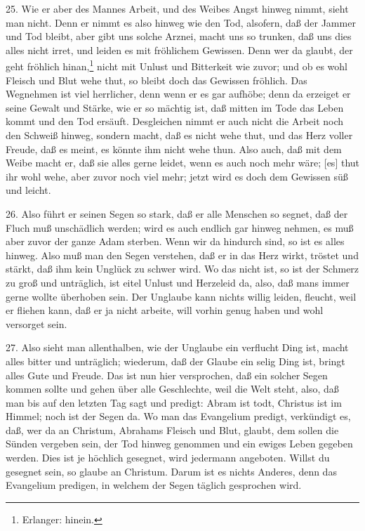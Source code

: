 25. Wie er aber des Mannes Arbeit, und des Weibes Angst hinweg nimmt, sieht man nicht. Denn er nimmt es also hinweg wie den Tod, alsofern, daß der Jammer und Tod bleibt, aber gibt uns solche Arznei, macht uns so trunken, daß uns dies alles nicht irret, und leiden es mit fröhlichem Gewissen. Denn wer da glaubt, der geht fröhlich hinan,\footnote{Erlanger: hinein.} nicht mit Unlust und Bitterkeit wie zuvor; und ob es wohl Fleisch und Blut wehe thut, so bleibt doch das Gewissen fröhlich. Das Wegnehmen ist viel herrlicher, denn wenn er es gar aufhöbe; denn da erzeiget er seine Gewalt und Stärke, wie er so mächtig ist, daß mitten im Tode das Leben kommt und den Tod ersäuft. Desgleichen nimmt er auch nicht die Arbeit noch den Schweiß hinweg, sondern macht, daß es nicht wehe thut, und das Herz voller Freude, daß es meint, es könnte ihm nicht wehe thun. Also auch, daß mit dem Weibe macht er, daß sie alles gerne leidet, wenn es auch noch mehr wäre; [es] thut ihr wohl wehe, aber zuvor noch viel mehr; jetzt wird es doch dem Gewissen süß und leicht.

26. Also führt er seinen Segen so stark, daß er alle Menschen so segnet, daß der Fluch muß unschädlich werden; wird es auch endlich gar hinweg nehmen, es muß aber zuvor der ganze Adam sterben. Wenn wir da hindurch sind, so ist es alles hinweg. Also muß man den Segen verstehen, daß er in das Herz wirkt, tröstet und stärkt, daß ihm kein Unglück zu schwer wird. Wo das nicht ist, so ist der Schmerz zu groß und unträglich, ist eitel Unlust und Herzeleid da, also, daß mans immer gerne wollte überhoben sein. Der Unglaube kann nichts willig leiden, fleucht, weil er fliehen kann, daß er ja nicht arbeite, will vorhin genug haben und wohl versorget sein.

27. Also sieht man allenthalben, wie der Unglaube ein verflucht Ding ist, macht alles bitter und unträglich; wiederum, daß der Glaube ein selig Ding ist, bringt alles Gute und Freude. Das ist nun hier versprochen, daß ein solcher Segen kommen sollte und gehen über alle Geschlechte, weil die Welt steht, also, daß man bis auf den letzten Tag sagt und predigt: Abram ist todt, Christus ist im Himmel; noch ist der Segen da. Wo man das Evangelium predigt, verkündigt es, daß, wer da an Christum, Abrahams Fleisch und Blut, glaubt, dem sollen die Sünden vergeben sein, der Tod hinweg genommen und ein ewiges Leben gegeben werden. Dies ist je höchlich gesegnet, wird jedermann angeboten. Willst du gesegnet sein, so glaube an Christum. Darum ist es nichts Anderes, denn das Evangelium predigen, in welchem der Segen täglich gesprochen wird.

